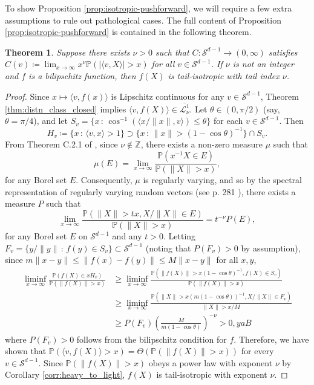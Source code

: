 \documentclass[nohyperref]{article}
\theoremstyle{plain}
\newtheorem{theorem}{Theorem}[section]
\theoremstyle{definition}
\theoremstyle{remark}
\begin{document}
To show Proposition \ref{prop:isotropic-pushforward}, we will require a few extra assumptions to rule out pathological cases. The full content of Proposition \ref{prop:isotropic-pushforward} is contained in the following theorem.

\begin{theorem}
Suppose there exists $\nu > 0$ such that $C:\mathcal{S}^{d-1}\to(0,\infty)$ satisfies $C(v) \coloneqq \lim_{x \to \infty}x^{\nu}\mathbb{P}(|\langle v, X\rangle| > x)$ for all $v \in \mathcal{S}^{d-1}$. If $\nu$ is not an integer and $f$ is a bilipschitz function,
then $f(X)$ is tail-isotropic with tail index $\nu$. 
\end{theorem}
\begin{proof}
Since $x \mapsto \langle v, f(x)\rangle$ is Lipschitz continuous for any $v \in \mathcal{S}^{d-1}$, Theorem \ref{thm:distn_class_closed} implies $\langle v, f(X)\rangle \in \overline{\mathcal{L}_{\nu}^{1}}$. Let $\theta \in (0,\pi/2)$ (say, $\theta = \pi / 4$), and let $S_v = \{x\, : \, \cos^{-1}(\langle x/\|x\|, v\rangle)\leq\theta\}$ for each $v \in \mathcal{S}^{d-1}$. Then
\[
H_v \coloneqq \{x\,:\,\langle v, x \rangle > 1\} \supset \{x\,:\,\|x\| > (1-\cos\theta)^{-1}\} \cap S_v.
\]
From Theorem C.2.1 of \citet{buraczewski2016stochastic}, since $\nu \not \in \mathbb{Z}$, there exists a non-zero measure $\mu$ such that
\[
\mu(E) = \lim_{x \to \infty} \frac{\mathbb{P}(x^{-1}X \in E)}{\mathbb{P}(\|X\| > x)},
\]
for any Borel set $E$. Consequently, $\mu$ is regularly varying, and so 
by the spectral representation of regularly varying random vectors (see p. 281 \citet{buraczewski2016stochastic}), there exists a measure $P$ such that
\[
\lim_{x \to \infty}\frac{\mathbb{P}(\|X\|>tx, X/\|X\| \in E)}{\mathbb{P}(\|X\| > x)} = t^{-\nu} P(E),
\]
for any Borel set $E$ on $\mathcal{S}^{d-1}$ and any $t > 0$. Letting $F_v = \{y / \|y\|\,:\, f(y) \in S_v\} \subset \mathcal{S}^{d-1}$ (noting that $P(F_v) > 0$ by assumption), since $m\|x - y\| \leq \|f(x) - f(y)\| \leq M\|x - y\|$ for all $x,y$,
\begin{align*}
\liminf_{x \to \infty}
\frac{\mathbb{P}(f(X) \in x H_v)}{\mathbb{P}(\|f(X)\| > x)} 
&\geq \liminf_{x \to \infty}\frac{\mathbb{P}(\|f(X)\| > x(1-\cos\theta)^{-1}, f(X) \in S_v)}{\mathbb{P}(\|f(X)\| > x)} \\
&\geq \liminf_{x \to \infty}\frac{\mathbb{P}(\|X\| > x(m(1-\cos\theta))^{-1}, X/\|X\| \in F_v)}{\|X\| > x / M} \\
&\geq P(F_v) \left(\frac{M}{m(1-\cos\theta)}\right)^{-\nu} > 0,
yaB\end{align*}
where $P(F_v) > 0$ follows from the bilipschitz condition for $f$. Therefore, we have shown that $\mathbb{P}(\langle v, f(X)\rangle > x) = \Theta(\mathbb{P}(\|f(X)\| > x))$ for every $v \in \mathcal{S}^{d-1}$.
Since $\mathbb{P}(\|f(X)\| > x)$ obeys a power law with exponent $\nu$ by Corollary \ref{corr:heavy_to_light}, $f(X)$ is tail-isotropic with exponent $\nu$.
\end{proof}
\end{document}
